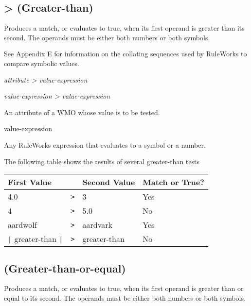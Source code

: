\subsection{\co> (Greater-than)}

Produces a match, or evaluates to true, when its first operand is
greater than its second. The operands must be either both numbers or
both symbols.

See Appendix E for information on the collating sequences used by
RuleWorks to compare symbolic values.

\Format

\ct\it{attribute} \co> \it{value-expression}

\it{value-expression} \co> \it{value-expression}

\begin{operands}
\item[\ct{attribute}]

  An attribute of a WMO whose value is to be tested.

\item[value-expression]

  Any RuleWorks expression that evaluates to a symbol or a number.
\end{operands}

\Example

The following table shows the results of several greater-than tests

\begin{center}
\begin{tabular}{lcll}
  \toprule
  First Value      &   & Second Value & Match or True? \\
  \midrule
  4.0              & \verb|>| & 3            & Yes            \\
  4                & \verb|>| & 5.0          & No             \\
  aardwolf         & \verb|>| & aardvark     & Yes            \\
  \verb,|, greater-than \verb,|, & \verb|>| & greater-than & No             \\
  \bottomrule
\end{tabular}
\end{center}

\subsection{\co{>=} (Greater-than-or-equal)}

Produces a match, or evaluates to true, when its first operand is
greater than or equal to its second. The operands must be either both
numbers or both symbols.


